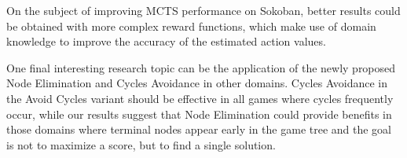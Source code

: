 \medskip\noindent
On the subject of improving MCTS performance on Sokoban, better results could be obtained with more complex reward functions, which make use of domain knowledge to improve the accuracy of the estimated action values.

\medskip\noindent
One final interesting research topic can be the application of the newly proposed Node Elimination and Cycles Avoidance in other domains. Cycles Avoidance in the Avoid Cycles variant should be effective in all games where cycles frequently occur, while our results suggest that Node Elimination could provide benefits in those domains where terminal nodes appear early in the game tree and the goal is not to maximize a score, but to find a single solution.
